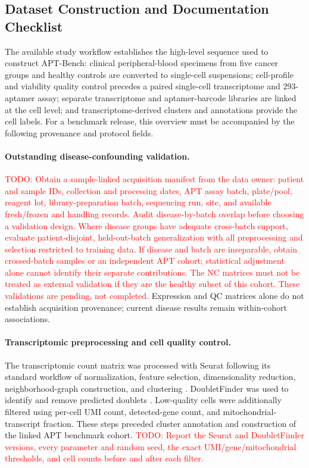 \documentclass{article} %
\newcommand{\todo}[1]{\textcolor{red}{TODO: #1}}
\begin{document}
\subsection{Dataset Construction and Documentation Checklist}
\label{sec:appendix:dataset_documentation}

The available study workflow establishes the high-level sequence used to construct
APT-Bench: clinical peripheral-blood specimens from five cancer groups and healthy
controls are converted to single-cell suspensions; cell-profile and viability quality
control precedes a paired single-cell transcriptome and 293-aptamer assay; separate
transcriptome and aptamer-barcode libraries are linked at the cell level; and
transcriptome-derived clusters and annotations provide the cell labels. For a
benchmark release, this overview must be accompanied by the following provenance
and protocol fields.

\paragraph{Outstanding disease-confounding validation.}
\todo{Obtain a sample-linked acquisition manifest from the data owner: patient
and sample IDs, collection and processing dates, APT assay batch, plate/pool,
reagent lot, library-preparation batch, sequencing run, site, and available
fresh/frozen and handling records. Audit disease-by-batch overlap before
choosing a validation design. Where disease groups have adequate cross-batch
support, evaluate patient-disjoint, held-out-batch generalization with all
preprocessing and selection restricted to training data. If disease and batch
are inseparable, obtain crossed-batch samples or an independent APT cohort;
statistical adjustment alone cannot identify their separate contributions.
The NC matrices must not be treated as external validation if they are the
healthy subset of this cohort. These validations are pending, not completed.}
Expression and QC matrices alone do not establish acquisition provenance;
current disease results remain within-cohort associations.

\paragraph{Transcriptomic preprocessing and cell quality control.}
The transcriptomic count matrix was processed with Seurat following its standard
workflow of normalization, feature selection, dimensionality reduction,
neighborhood-graph construction, and clustering \citep{hao2021integrated}.
DoubletFinder was used to identify and remove predicted doublets
\citep{mcginnis2019doubletfinder}. Low-quality cells were additionally filtered
using per-cell UMI count, detected-gene count, and mitochondrial-transcript
fraction. These steps preceded cluster annotation and construction of the linked
APT benchmark cohort. \todo{Report the Seurat and DoubletFinder versions, every
parameter and random seed, the exact UMI/gene/mitochondrial thresholds, and cell
counts before and after each filter.}
\end{document}
